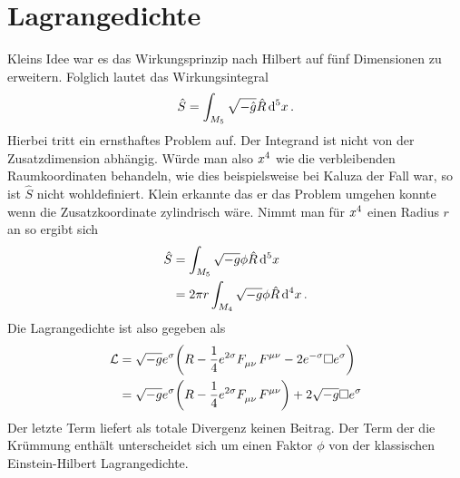 \section{Lagrangedichte}
Kleins Idee war es das Wirkungsprinzip nach Hilbert auf fünf Dimensionen zu
erweitern. Folglich lautet das Wirkungsintegral
\begin{equation}
\hat{S}=\int_{M_5}\sqrt{-\hat{g}}\hat{R}\dif{^5}
x\,.
\end{equation}
Hierbei tritt ein ernsthaftes Problem auf. Der Integrand ist nicht von der
Zusatzdimension abhängig. Würde man also $\tensor{x}{^4}$ wie die verbleibenden
Raumkoordinaten behandeln, wie dies beispielsweise bei Kaluza der Fall war, so
ist $\hat{S}$ nicht wohldefiniert. Klein erkannte das er das Problem umgehen
konnte wenn die Zusatzkoordinate zylindrisch wäre. Nimmt man für 
$\tensor{x}{^4}$ einen Radius $r$ an so ergibt sich
\begin{equation}
\begin{split}
\hat{S}&=\int_{M_5}\sqrt{-g}\phi\hat{R}\dif{^5}x\\
&=2\pi
r\int_{M_4}\sqrt{-g}\phi\hat{R}\dif{^4}x\,.
\end{split}
\end{equation}
Die Lagrangedichte ist also gegeben als
\begin{equation}
\begin{split}
\mathcal{L}&=\sqrt{-g}e^{\sigma}\left(R-\frac{1}{4}e^{2\sigma}\tensor{F}{_\mu_\nu}\tensor{F}{^\mu^\nu}
-2e^{-\sigma}\square e^{\sigma}\right)\\
&=\sqrt{-g}e^{\sigma}\left(R-\frac{1}{4}e^{2\sigma}\tensor{F}{_\mu_\nu}\tensor{F}{^\mu^\nu}\right)+2\sqrt{-g}\square
e^{\sigma}\label{eq:Lagrange1}
\end{split}
\end{equation}
Der letzte Term liefert als totale Divergenz keinen Beitrag.
Der Term der die Krümmung enthält unterscheidet sich um einen Faktor $\phi$ von
der klassischen Einstein-Hilbert Lagrangedichte.
